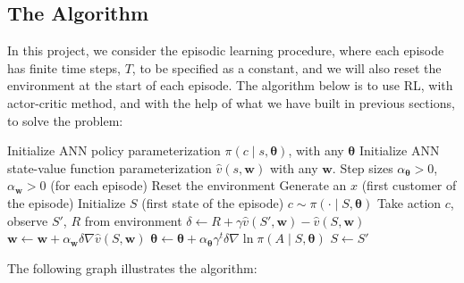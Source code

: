 \documentclass[11pt]{article}
\begin{document}
\subsection{The Algorithm}
In this project, we consider the episodic learning procedure, where each 
episode has finite time steps, \(T\), to be specified as a constant, and we 
will also reset the environment at the start of each episode. The algorithm 
below is to use RL, with actor-critic method, and with the help of what we 
have built in previous sections, to solve the problem:
\begin{algorithm}[H]
\caption{Actor-Critic for our financial problem}
\begin{algorithmic}[1]
\State Initialize ANN policy parameterization 
\(\pi\left(c\middle|s, \bm{\theta}\right)\), with any \(\bm{\theta}\)
\State Initialize ANN state-value function parameterization
\(\hat{v}(s,\bm{w})\) with any \(\bm{w}\).
\State Step sizes \(\alpha_{\bm{\theta}}>0\), \(\alpha_{\bm{w}}>0\)
\Loop \hspace{0.3mm} (for each episode)
    \State Reset the environment
    \State Generate an \(x\) (first customer of the episode)
    \State Initialize \(S\) (first state of the episode)
        \State \(c\sim\pi\left(\cdot\middle|S, \bm{\theta}\right)\)
        \State Take action \(c\), observe \(S'\), \(R\) from environment
        \State \(\delta \gets R + \gamma\hat{v}(S',\bm{w})-\hat{v}(S,\bm{w})\)
        \State \(\bm{w} \gets \bm{w} + 
        \alpha_{\bm{w}} \delta\nabla\hat{v}(S,\bm{w})\)
        \State \(\bm{\theta} \gets \bm{\theta} 
        + \alpha_{\bm{\theta}}\gamma^{t}\delta
        \nabla\ln{\pi\left(A\middle|S, \bm{\theta}\right)}\)
        \State \(S \gets S'\)
    \EndFor
\EndLoop
\end{algorithmic}
\end{algorithm}
\noindent The following graph illustrates the algorithm:
\vspace{5mm}
\end{document}
